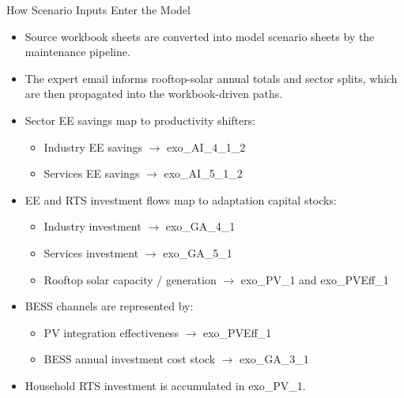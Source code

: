 \documentclass[aspectratio=169]{beamer}
\begin{document}
\begin{frame}{How Scenario Inputs Enter the Model}
\small
\begin{itemize}
  \item Source workbook sheets are converted into model scenario sheets by the maintenance pipeline.
  \item The expert email informs rooftop-solar annual totals and sector splits, which are then propagated into the workbook-driven paths.
  \item Sector EE savings map to productivity shifters:
  \begin{itemize}
    \item Industry EE savings $\rightarrow$ exo\_AI\_4\_1\_2
    \item Services EE savings $\rightarrow$ exo\_AI\_5\_1\_2
  \end{itemize}
  \item EE and RTS investment flows map to adaptation capital stocks:
  \begin{itemize}
    \item Industry investment $\rightarrow$ exo\_GA\_4\_1
    \item Services investment $\rightarrow$ exo\_GA\_5\_1
    \item Rooftop solar capacity / generation $\rightarrow$ exo\_PV\_1 and exo\_PVEff\_1
  \end{itemize}
  \item BESS channels are represented by:
  \begin{itemize}
    \item PV integration effectiveness $\rightarrow$ exo\_PVEff\_1
    \item BESS annual investment cost stock $\rightarrow$ exo\_GA\_3\_1
  \end{itemize}
  \item Household RTS investment is accumulated in exo\_PV\_1.
\end{itemize}
\end{frame}
\end{document}
